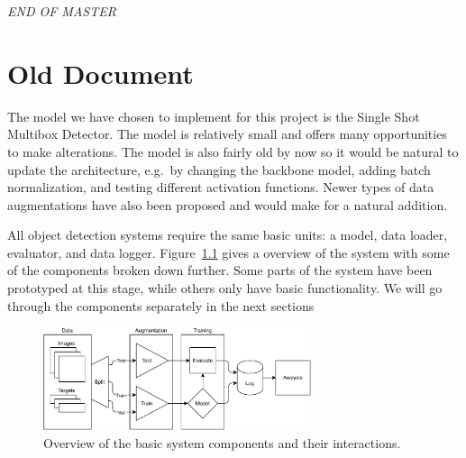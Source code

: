 \vspace*{\fill}
\begin{center}
    \textit{END OF MASTER}\thispagestyle{empty}
\end{center}
\vspace*{\fill}
%

\chapter{Old Document}

The model we have chosen to implement for this project is the Single Shot Multibox Detector.
The model is relatively small and offers many opportunities to make alterations.
The model is also fairly old by now so it would be natural to update the architecture, e.g.~by changing the backbone model, adding batch normalization, and testing different activation functions.
Newer types of data augmentations have also been proposed and would make for a natural addition.

All object detection systems require the same basic units: a model, data loader, evaluator, and data logger.
Figure~\ref{fig:sys} gives a overview of the system with some of the components broken down further.
Some parts of the system have been prototyped at this stage, while others only have basic functionality.
We will go through the components separately in the next sections

\begin{figure}[htb]
  \centering
  \includegraphics[width=0.7\textwidth]{figs/system.pdf}
  \caption[System overview]{Overview of the basic system components and their interactions.}\label{fig:sys}
\end{figure}


